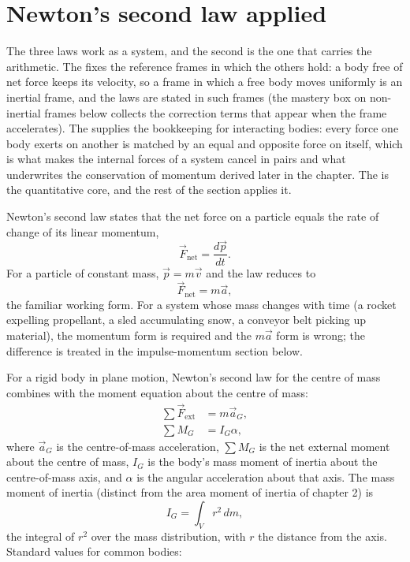 \section{Newton's second law applied}

The three laws work as a system, and the second is the one that carries
the arithmetic. The  fixes the reference frames in
which the others hold: a body free of net force keeps its velocity, so
a frame in which a free body moves uniformly is an inertial frame, and
the laws are stated in such frames (the mastery box on non-inertial
frames below collects the correction terms that appear when the frame
accelerates). The  supplies the bookkeeping for
interacting bodies: every force one body exerts on another is matched
by an equal and opposite force on itself, which is what makes the
internal forces of a system cancel in pairs and what underwrites the
conservation of momentum derived later in the chapter. The
 is the quantitative core, and the rest of the
section applies it.

Newton's second law states that the net force on a particle equals
the rate of change of its linear momentum,
\[
\vec{F}_{\text{net}} = \frac{d\vec{p}}{dt}.
\]
For a particle of constant mass, $\vec{p} = m\vec{v}$ and the law
reduces to
\[
\vec{F}_{\text{net}} = m\vec{a},
\]
the familiar working form. For a system whose mass changes with time
(a rocket expelling propellant, a sled accumulating snow, a conveyor
belt picking up material), the momentum form is required and the
$m\vec{a}$ form is wrong; the difference is treated in the
impulse-momentum section below.

For a rigid body in plane motion, Newton's second law for the
centre of mass combines with the moment equation about the centre of
mass:
\begin{align*}
\sum \vec{F}_{\text{ext}} &= m\vec{a}_G, \\
\sum M_G &= I_G \alpha,
\end{align*}
where $\vec{a}_G$ is the centre-of-mass acceleration, $\sum M_G$ is
the net external moment about the centre of mass, $I_G$ is the
body's mass moment of inertia about the centre-of-mass axis, and
$\alpha$ is the angular acceleration about that axis. The mass moment
of inertia (distinct from the area moment of inertia of chapter 2)
is
\[
I_G = \int_V r^2 \,dm,
\]
the integral of $r^2$ over the mass distribution, with $r$ the
distance from the axis. Standard values for common bodies:

